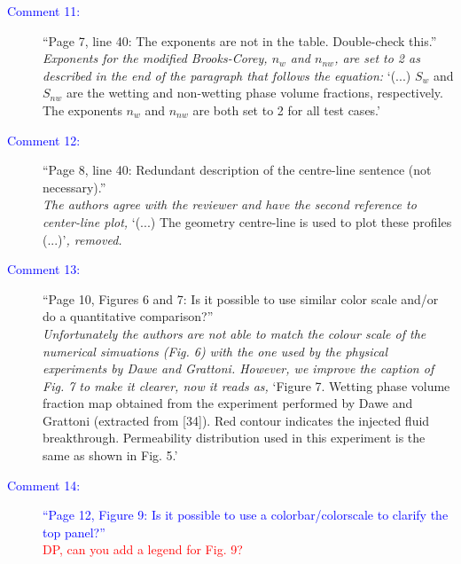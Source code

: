 \documentclass[12pts,a4paper,amsmath,amssymb,floatfix]{article}
\newcommand{\red}{\textcolor{red}}
\newcommand{\blue}{\textcolor{blue}}
\begin{document}
\begin{description}
\item[\blue{Comment 11:}] ``Page 7, line 40: The exponents are not in the table. Double-check this.''\\
{\it Exponents for the modified Brooks-Corey, $n_w$ and $n_{nw}$, are set to 2 as described in the end of the paragraph that follows the equation:} `(...) $S_w$ and $S_{nw}$ are the wetting and non-wetting phase volume fractions, respectively. The exponents $n_w$ and $n_{nw}$ are both set to 2 for all test cases.'
\item[\blue{Comment 12:}] ``Page 8, line 40: Redundant description of the centre-line sentence (not necessary).''\\
{\it The authors agree with the reviewer and have the second reference to center-line plot,} `(...) The geometry centre-line is used to plot these profiles (...)'{\it, removed.}
\item[\blue{Comment 13:}] ``Page 10, Figures 6 and 7: Is it possible to use similar color scale and/or do a quantitative comparison?''\\
{\it Unfortunately the authors are not able to match the colour scale of the numerical simuations (Fig. 6) with the one used by the physical experiments by Dawe and Grattoni. However, we improve the caption of Fig. 7 to make it clearer, now it reads as,} `Figure 7. Wetting phase volume fraction map obtained from the experiment performed by Dawe and Grattoni (extracted from [34]). Red contour indicates the injected fluid breakthrough. Permeability distribution used in this experiment is the same as shown in Fig. 5.'
\item[\blue{Comment 14:}] \blue{``Page 12, Figure 9: Is it possible to use a colorbar/colorscale to clarify the top panel?''}\\
\red{DP, can you add a legend for Fig. 9?} 

\end{description}
\end{document}
